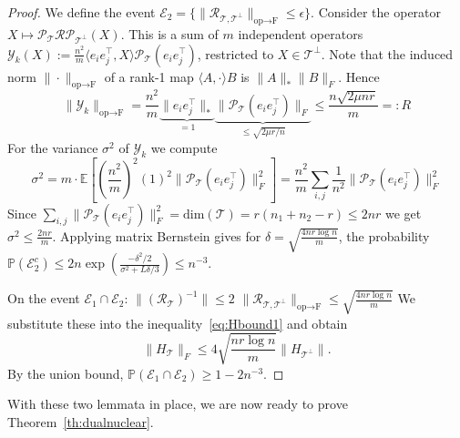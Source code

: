 \begin{proof}
We define the event $\mathcal{E}_2 = \{ \|\mathcal{R}_{\mathcal{T}, \mathcal{T}^\perp}\|_{\text{op} \to \text{F}} \le \epsilon \}$.
Consider the operator $X \mapsto \mathcal{P}_{\mathcal{T}} \mathcal{R} \mathcal{P}_{\mathcal{T}^\perp}(X)$. This is a sum of $m$ independent operators $\mathcal{Y}_k(X) := \frac{n^2}{m} \langle e_i e_j^\top, X \rangle \mathcal{P}_{\mathcal{T}}(e_i e_j^\top)$, restricted to $X \in \mathcal{T}^\perp$.
Note that the induced norm $\|\cdot\|_{\text{op} \to \text{F}}$ of a rank-1 map $\langle A, \cdot \rangle B$ is $\|A\|_* \|B\|_F$. Hence
$$\|\mathcal{Y}_k\|_{\text{op} \to \text{F}} = \frac{n^2}{m} \underbrace{\|e_i e_j^\top\|_*}_{=1} \underbrace{\|\mathcal{P}_{\mathcal{T}}(e_i e_j^\top)\|_F}_{\le \sqrt{2\mu r/n}} \le \frac{n \sqrt{2\mu n r}}{m} =: R$$
For the variance $\sigma^2$ of $\mathcal{Y}_k$ we compute
$$\sigma^2 = m \cdot \mathbb{E} \left[ \left(\frac{n^2}{m}\right)^2 (1)^2 \|\mathcal{P}_{\mathcal{T}}(e_i e_j^\top)\|_F^2 \right] = \frac{n^2}{m} \sum_{i,j} \frac{1}{n^2} \|\mathcal{P}_{\mathcal{T}}(e_i e_j^\top)\|_F^2$$
Since $\sum_{i,j} \|\mathcal{P}_{\mathcal{T}}(e_i e_j^\top)\|_F^2 = \text{dim}(\mathcal{T}) = r(n_1 + n_2 - r) \le 2nr$ we get $\sigma^2 \le \frac{2nr}{m}$.
Applying matrix Bernstein gives for $\delta = \sqrt{\frac{4nr \log n}{m}}$, the probability $\mathbb{P}(\mathcal{E}_2^c) \le 2n \exp(\frac{-\delta^2/2}{\sigma^2 + L\delta/3}) \le n^{-3}$.

On the event $\mathcal{E}_1 \cap \mathcal{E}_2$:
$\|(\mathcal{R}_{\mathcal{T}})^{-1}\| \le 2$
$\|\mathcal{R}_{\mathcal{T}, \mathcal{T}^\perp}\|_{\text{op} \to \text{F}} \le \sqrt{\frac{4nr \log n}{m}}$
We substitute these into the inequality~\eqref{eq:Hbound1} and obtain
$$\|H_{\mathcal{T}}\|_F \le 4 \sqrt{\frac{nr \log n}{m}}  \|H_{\mathcal{T}^\perp}\|.$$
By the union bound, $\mathbb{P}(\mathcal{E}_1 \cap \mathcal{E}_2) \ge 1 - 2n^{-3}$. 
   
\end{proof}


With these two lemmata in place, we are now ready to prove Theorem~\ref{th:dualnuclear}.


